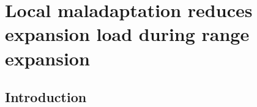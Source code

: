 \chapter{Local maladaptation reduces expansion load during range expansion}
\label{chap:expansionload}





\section{Introduction}

